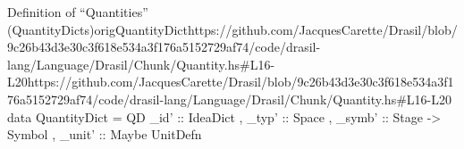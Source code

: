 \begin{haskell}{Definition of ``Quantities'' (QuantityDicts)}{origQuantityDict}{https://github.com/JacquesCarette/Drasil/blob/9c26b43d3e30c3f618e534a3f176a5152729a\newline{}f74/code/drasil-lang/Language/Drasil/Chunk/Quantity.hs\#L16-L20}{https://github.com/JacquesCarette/Drasil/blob/9c26b43d3e30c3f618e534a3f176a5152729af74/code/drasil-lang/Language/Drasil/Chunk/Quantity.hs\#L16-L20}
data QuantityDict = QD { _id' :: IdeaDict
                       , _typ' :: Space
                       , _symb' :: Stage -> Symbol
                       , _unit' :: Maybe UnitDefn
                       }
\end{haskell}
